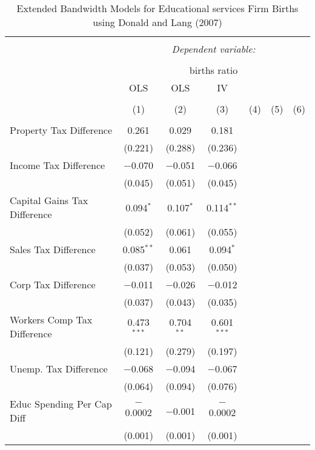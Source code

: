 
\begin{table}[!htbp] \centering 
  \caption{Extended Bandwidth Models for  Educational services Firm Births using Donald and Lang (2007)} 
  \label{} 
\begin{tabular}{@{\extracolsep{5pt}}lcccccc} 
\\[-1.8ex]\hline 
\hline \\[-1.8ex] 
 & \multicolumn{6}{c}{\textit{Dependent variable:}} \\ 
\cline{2-7} 
\\[-1.8ex] & \multicolumn{6}{c}{births ratio} \\ 
 & OLS & OLS & IV &  &  &  \\ 
\\[-1.8ex] & (1) & (2) & (3) & (4) & (5) & (6)\\ 
\hline \\[-1.8ex] 
 Property Tax Difference & 0.261 & 0.029 & 0.181 &  &  &  \\ 
  & (0.221) & (0.288) & (0.236) &  &  &  \\ 
  Income Tax Difference & $-$0.070 & $-$0.051 & $-$0.066 &  &  &  \\ 
  & (0.045) & (0.051) & (0.045) &  &  &  \\ 
  Capital Gains Tax Difference & 0.094$^{*}$ & 0.107$^{*}$ & 0.114$^{**}$ &  &  &  \\ 
  & (0.052) & (0.061) & (0.055) &  &  &  \\ 
  Sales Tax Difference & 0.085$^{**}$ & 0.061 & 0.094$^{*}$ &  &  &  \\ 
  & (0.037) & (0.053) & (0.050) &  &  &  \\ 
  Corp Tax Difference & $-$0.011 & $-$0.026 & $-$0.012 &  &  &  \\ 
  & (0.037) & (0.043) & (0.035) &  &  &  \\ 
  Workers Comp Tax Difference & 0.473$^{***}$ & 0.704$^{**}$ & 0.601$^{***}$ &  &  &  \\ 
  & (0.121) & (0.279) & (0.197) &  &  &  \\ 
  Unemp. Tax Difference & $-$0.068 & $-$0.094 & $-$0.067 &  &  &  \\ 
  & (0.064) & (0.094) & (0.076) &  &  &  \\ 
  Educ Spending Per Cap Diff & $-$0.0002 & $-$0.001 & $-$0.0002 &  &  &  \\ 
  & (0.001) & (0.001) & (0.001) &  &  &  \\ 

\end{tabular}
\end{table}
